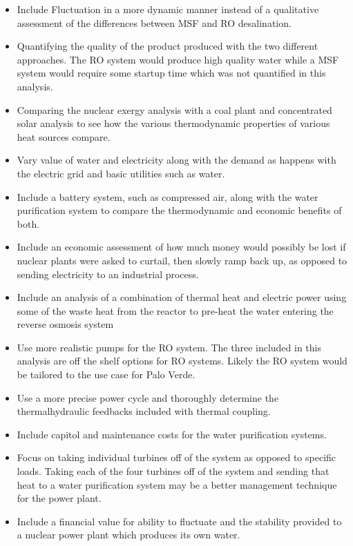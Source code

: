\documentclass[12pt]{UIdahoMastersThesis}
\begin{document}
\begin{itemize}
\item Include Fluctuation in a more dynamic manner instead of a qualitative assessment of the differences between MSF and RO desalination.
\item Quantifying the quality of the product produced with the two different approaches.  The RO system would produce high quality water while a MSF system would require some startup time which was not quantified in this analysis.
\item Comparing the nuclear exergy analysis with a coal plant and concentrated solar analysis to see how the various thermodynamic properties of various heat sources compare.
\item Vary value of water and electricity along with the demand as happens with the electric grid and basic utilities such as water.
\item Include a battery system, such as compressed air, along with the water purification system to compare the thermodynamic and economic benefits of both.
\item Include an economic assessment of how much money would possibly be lost if nuclear plants were asked to curtail, then slowly ramp back up, as opposed to sending electricity to an industrial process.
\item Include an analysis of a combination of thermal heat and electric power using some of the waste heat from the reactor to pre-heat the water entering the reverse osmosis system
\item Use more realistic pumps for the RO system.  The three included in this analysis are off the shelf options for RO systems.  Likely the RO system would be tailored to the use case for Palo Verde.
\item Use a more precise power cycle and thoroughly determine the thermalhydraulic feedbacks included with thermal coupling.
\item Include capitol and maintenance costs for the water purification systems.
\item Focus on taking individual turbines off of the system as opposed to specific loads.  Taking each of the four turbines off of the system and sending that heat to a water purification system may be a better management technique for the power plant.
\item Include a financial value for ability to fluctuate and the stability provided to a nuclear power plant which produces its own water.
\end{itemize}
\end{document}

